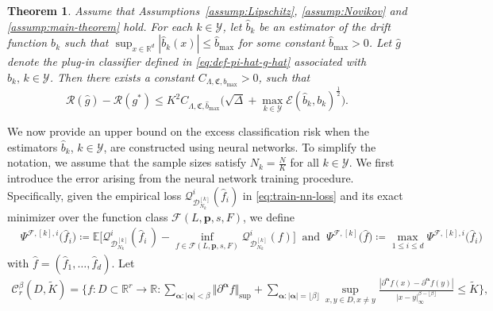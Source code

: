 \documentclass{article}
\theoremstyle{plain}
\newtheorem{theorem}{Theorem}[section]
\theoremstyle{definition}
\theoremstyle{remark}
\newcommand{\RD}{\mathbb{R}^{d}}
\newcommand{\RR}{\mathbb{R}}
\newcommand{\EE}{\mathbb{E}}
\newcommand{\calY}{\mathcal{Y}}
\newcommand{\calR}{\mathcal{R}}
\newcommand{\calE}{\mathcal{E}}
\begin{document}
\begin{theorem}\label{thm:main-decomposition}
Assume that Assumptions~\ref{assump:Lipschitz}, \ref{assump:Novikov} and \ref{assump:main-theorem} hold.
For each \( k \in \mathcal Y \), let \( \widehat b_k \) be an estimator of the drift function \( b_k \) such that 
$\sup_{x\in\RD} |\widehat b_k(x)|\leq \widehat b_{\max}$ for some constant $\widehat b_{\max}>0$. Let \( \widehat g \) denote the plug-in classifier defined in \eqref{eq:def-pi-hat-g-hat} associated with \( \widehat b_k, \,k\in\calY \). 
Then there exists a constant \( C_{\Lambda, \mathfrak{C}, b_{\max}} > 0 \), such that
\begin{equation}\label{eq:inequality-in-main-thm}
    \calR(\widehat{g})-\mathcal{R}(g^*)\leq K^2 C_{\Lambda, \mathfrak{C}, \widehat b_{\max}}\big(\sqrt{\Delta} + \max_{k\in\calY}\calE(\widehat b_k, b_k)^{\frac{1}{2}}\big).
\end{equation}
\end{theorem}
We now provide an upper bound on the excess classification risk when the estimators
\(\widehat b_k\), \(k\in\mathcal Y\), are constructed using neural networks.
To simplify the notation, we assume that the sample sizes satisfy \(N_k=\tfrac{N}{K}\) for all
\(k\in\mathcal Y\).
We first introduce the error arising from the neural network training procedure.
Specifically, given the empirical loss $\mathcal{Q}^i_{\mathcal D_{N_k}^{[k]}}(\widehat{f}_i)$ in \eqref{eq:train-nn-loss} and its exact minimizer
over the function class \(\mathcal{F}(L,\mathbf{p},s,F)\), we define
\begin{align}\label{eq:def-psi-i}
&\Psi^{\mathcal{F}, [k],i}\big(\widehat f_i\big)
\coloneqq \EE\Big[
\mathcal{Q}^i_{\mathcal D_{N_k}^{[k]}}(\widehat f_i\,)-\inf_{f\in\mathcal{F}(L,\mathbf{p},s,F)} \mathcal{Q}^i_{\mathcal D_{N_k}^{[k]}}(f)
\Big]\:\text{  and  }\:\Psi^{\mathcal{F}, [k]}\big(\widehat f\big)\coloneqq \max_{1\leq i\leq d}\Psi^{\mathcal{F}, [k],i}\big(\widehat f_i\big) \nonumber
\end{align}
with $\widehat f=(\widehat f_1, \dots, \widehat f_d)$. 
Let 
\begin{align}
\mathcal{C}_{r}^{\beta}(D, \widetilde{K})\!=\!\bigg\{f:D\subset \RR^r\rightarrow \RR :\!\!
\!\!\!\sum_{\boldsymbol{\alpha}:|\boldsymbol{\alpha}|<\beta}\!\!\Vert \partial^{\boldsymbol{\alpha}}f\Vert_{\sup}+\!\!\!\!\!\sum_{\boldsymbol{\alpha}:|\boldsymbol{\alpha}|=\lfloor\beta\rfloor}\sup_{x,y\in D, x\neq y}\!\!\frac{|\partial^{\boldsymbol{\alpha}}f(x)-\partial^{\boldsymbol{\alpha}}f(y)|}{|x-y|_{\infty}^{\beta - \lfloor\beta\rfloor}}\leq \widetilde{K}\bigg\},\nonumber
\end{align}
\end{document}
